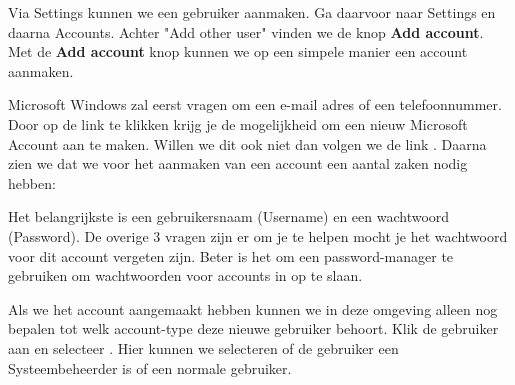 Via Settings kunnen we een gebruiker aanmaken. Ga daarvoor naar Settings en daarna Accounts. Achter \textquote"Add other user" vinden we de knop \textbf{Add account}. Met de \textbf{Add account} knop kunnen we op een simpele manier een account aanmaken.

Microsoft Windows zal eerst vragen om een e-mail adres of een telefoonnummer. Door op de link  te klikken krijg je de mogelijkheid om een nieuw Microsoft Account aan te maken. Willen we dit ook niet dan volgen we de link . Daarna zien we dat we voor het aanmaken van een account een aantal zaken nodig hebben:

\begin{minipage}[t]{\linewidth}
\raggedright
{}
\end{minipage}

Het belangrijkste is een gebruikersnaam (Username) en een wachtwoord (Password). De overige 3 vragen zijn er om je te helpen mocht je het wachtwoord voor dit account vergeten zijn. Beter is het om een password-manager te gebruiken om wachtwoorden voor accounts in op te slaan.

Als we het account aangemaakt hebben kunnen we in deze omgeving alleen nog bepalen tot welk account-type deze nieuwe gebruiker behoort. Klik de gebruiker aan en selecteer . Hier kunnen we selecteren of de gebruiker een Systeembeheerder is of een normale gebruiker.

\begin{minipage}[t]{\linewidth}
\raggedright
{}
\end{minipage}

